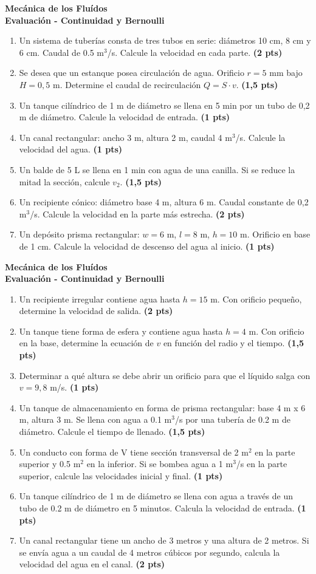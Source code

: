 \documentclass[a4paper,11pt]{article}
\newcommand{\prob}[2]{\item #1 \textbf{(#2 pts)}}
\begin{document}
\vspace{0.2cm}

\noindent
\begin{minipage}[t][0.47\textheight][t]{0.48\textwidth}
  \begin{center}
    \textbf{\large Mecánica de los Fluídos}\\
    \textbf{\Large Evaluación - Continuidad y Bernoulli}
  \end{center}
  \begin{enumerate}
    \prob{Un sistema de tuberías consta de tres tubos en serie: diámetros 10 cm, 8 cm y 6 cm. Caudal de 0.5 m$^3$/s. Calcule la velocidad en cada parte.}{2}
    \prob{Se desea que un estanque posea circulación de agua. Orificio $r=5$ mm bajo $H=0,5$ m. Determine el caudal de recirculación $Q=S \cdot v$.}{1,5}
    \prob{Un tanque cilíndrico de 1 m de diámetro se llena en 5 min por un tubo de 0,2 m de diámetro. Calcule la velocidad de entrada.}{1}
    \prob{Un canal rectangular: ancho 3 m, altura 2 m, caudal 4 m$^3$/s. Calcule la velocidad del agua.}{1}
    \prob{Un balde de 5 L se llena en 1 min con agua de una canilla. Si se reduce la mitad la sección, calcule $v_2$.}{1,5}
    \prob{Un recipiente cónico: diámetro base 4 m, altura 6 m. Caudal constante de 0,2 m$^3$/s. Calcule la velocidad en la parte más estrecha.}{2}
    \prob{Un depósito prisma rectangular: $w=6$ m, $l=8$ m, $h=10$ m. Orificio en base de 1 cm. Calcule la velocidad de descenso del agua al inicio.}{1}
  \end{enumerate}
\end{minipage}
\hfill
\begin{minipage}[t][0.47\textheight][t]{0.48\textwidth}
  \begin{center}
    \textbf{\large Mecánica de los Fluídos}\\
    \textbf{\Large Evaluación - Continuidad y Bernoulli}
  \end{center}
  \begin{enumerate}
    \prob{Un recipiente irregular contiene agua hasta $h=15$ m. Con orificio pequeño, determine la velocidad de salida.}{2}
    \prob{Un tanque tiene forma de esfera y contiene agua hasta $h=4$ m. Con orificio en la base, determine la ecuación de $v$ en función del radio y el tiempo.}{1,5}
    \prob{Determinar a qué altura se debe abrir un orificio para que el líquido salga con $v=9,8$ m/s.}{1}
    \prob{Un tanque de almacenamiento en forma de prisma rectangular: base 4 m x 6 m, altura 3 m. Se llena con agua a 0.1 m$^3$/s por una tubería de 0.2 m de diámetro. Calcule el tiempo de llenado.}{1,5}
    \prob{Un conducto con forma de V tiene sección transversal de 2 m$^2$ en la parte superior y 0.5 m$^2$ en la inferior. Si se bombea agua a 1 m$^3$/s en la parte superior, calcule las velocidades inicial y final.}{1}
    \prob{Un tanque cilíndrico de 1 m de diámetro se llena con agua a través de un tubo de 0.2 m de diámetro en 5 minutos. Calcula la velocidad de entrada.}{1}
    \prob{Un canal rectangular tiene un ancho de 3 metros y una altura de 2 metros. Si se envía agua a un caudal de 4 metros cúbicos por segundo, calcula la velocidad del agua en el canal.}{2}
  \end{enumerate}
\end{minipage}
\end{document}
